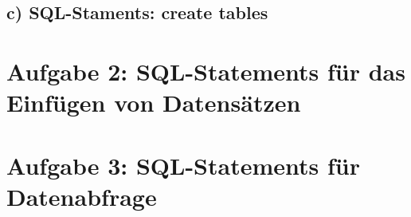 \documentclass[10pt,a4paper]{article}
\begin{document}
\subsection{c) SQL-Staments: create tables}



\section{Aufgabe 2: SQL-Statements für das Einfügen von Datensätzen}


\section{Aufgabe 3: SQL-Statements für Datenabfrage}



\end{document}

